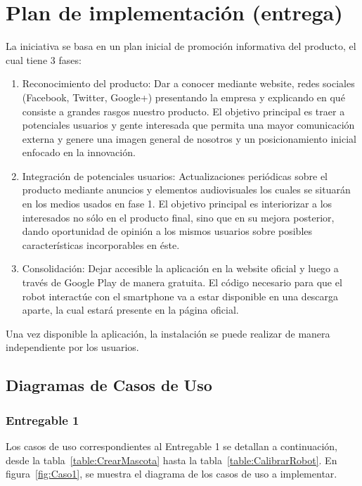 \newpage
%
%
\section{Plan de implementaci\'on (entrega)}
La iniciativa se basa en un plan inicial de promoci\'on informativa del producto, el cual tiene 3 fases:

\begin{enumerate}
\item Reconocimiento del producto: Dar a conocer mediante website, redes sociales (Facebook, Twitter, Google+) presentando la empresa y explicando en qu\'e consiste a grandes rasgos nuestro producto. El objetivo principal es traer a potenciales usuarios y gente interesada que permita una mayor comunicaci\'on externa y genere una imagen general de nosotros y un posicionamiento inicial enfocado en la innovaci\'on.
\item Integraci\'on de potenciales usuarios: Actualizaciones peri\'odicas sobre el producto mediante anuncios y elementos audiovisuales los cuales se situar\'an en los medios usados en fase 1. El objetivo principal es interiorizar a los interesados no s\'olo en el producto final, sino que en su mejora posterior, dando oportunidad de opini\'on a los mismos usuarios sobre posibles caracter\'isticas incorporables en \'este.
\item Consolidaci\'on: Dejar accesible la aplicaci\'on en la website oficial y luego a trav\'es de Google Play de manera gratuita. El c\'odigo necesario para que el robot interact\'ue con el smartphone va a estar disponible en una descarga aparte, la cual estar\'a presente en la p\'agina oficial.
\end{enumerate}

Una vez disponible la aplicaci\'on, la instalaci\'on se puede realizar de manera independiente por los usuarios.

%
%
\newpage
\subsection{Diagramas de Casos de Uso}

%
%
\subsubsection{Entregable 1}

Los casos de uso correspondientes al Entregable 1 se detallan a continuaci\'on, desde la tabla~\ref{table:CrearMascota} hasta la tabla~\ref{table:CalibrarRobot}. En figura~\ref{fig:Caso1}, se muestra el diagrama de los casos de uso a implementar.

